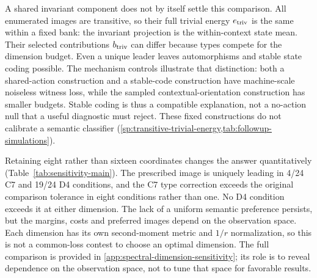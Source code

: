 \begin{table}[t]
\centering\small

\caption{Registration margins at $r=16$ in all 24 fixed conditions per domain. Positive values favor the prescribed image over the strongest or median alternative. U/T/B counts unique leading, tied leading and behind under the recorded pairwise tolerance. The margins measure spectral-budget differences between coherent target actions.}
\label{tab:bounded-margins}
\end{table}

A shared invariant component does not by itself settle this comparison. All enumerated images are transitive, so their full trivial energy $e_{\rm triv}$ is the same within a fixed bank: the invariant projection is the within-context state mean. Their selected contributions $b_{\rm triv}$ can differ because types compete for the dimension budget. Even a unique leader leaves automorphisms and stable state coding possible. The mechanism controls illustrate that distinction: both a shared-action construction and a stable-code construction have machine-scale noiseless witness loss, while the sampled contextual-orientation construction has smaller budgets. Stable coding is thus a compatible explanation, not a no-action null that a useful diagnostic must reject. These fixed constructions do not calibrate a semantic classifier (\cref{sp:transitive-trivial-energy,tab:followup-simulations}).


Retaining eight rather than sixteen coordinates changes the answer quantitatively (Table~\ref{tab:sensitivity-main}). The prescribed image is uniquely leading in 4/24 C7 and 19/24 D4 conditions, and the C7 type correction exceeds the original comparison tolerance in eight conditions rather than one. No D4 condition exceeds it at either dimension. The lack of a uniform semantic preference persists, but the margins, costs and preferred images depend on the observation space. Each dimension has its own second-moment metric and $1/r$ normalization, so this is not a common-loss contest to choose an optimal dimension. The full comparison is provided in \cref{app:spectral-dimension-sensitivity}; its role is to reveal dependence on the observation space, not to tune that space for favorable results.

